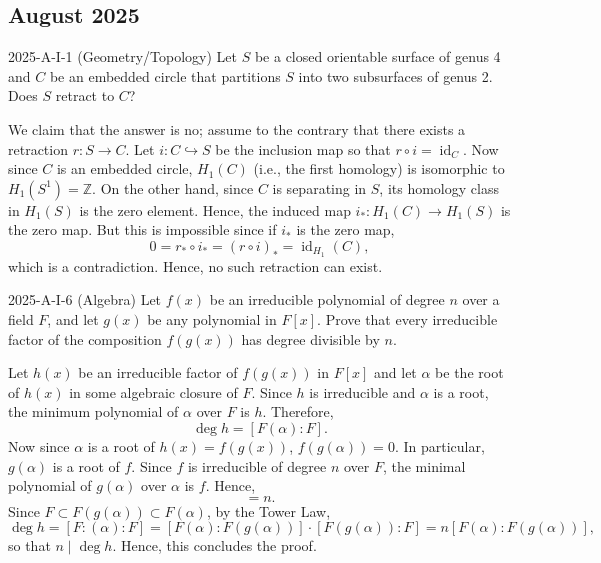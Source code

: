 \documentclass{article}
\begin{document}
\subsection{August 2025}
\begin{prb}{2025-A-I-1 (Geometry/Topology)}
	Let $S$ be a closed orientable surface of genus 4 and $C$ be an embedded circle that partitions $S$ into two subsurfaces of genus 2. Does $S$ retract to $C$? 
\end{prb}
\begin{solutions}
	We claim that the answer is no; assume to the contrary that there exists a retraction $r: S \to C$. Let $i: C \hookrightarrow S$ be the inclusion map so that $r \circ i = \operatorname{id}_{C}$. Now since $C$ is an embedded circle, $H_{1}(C)$ (i.e., the first homology) is isomorphic to $H_{1}(S^{1}) = \mathbb{Z}$. On the other hand, since $C$ is separating in $S$, its homology class in $H_{1}(S)$ is the zero element. Hence, the induced map $i_{\ast}: H_{1}(C) \to H_{1}(S)$ is the zero map. But this is impossible since if $i_{\ast}$ is the zero map,
	\begin{equation}
		0 = r_{\ast} \circ i_{\ast} = (r \circ i)_{\ast} = \operatorname{id}_{H_{1}}(C),
	\end{equation}
	which is a contradiction. Hence, no such retraction can exist. 
\end{solutions}
\begin{prb}{2025-A-I-6 (Algebra)}
	Let $f(x)$ be an irreducible polynomial of degree $n$ over a field $F$, and let $g(x)$ be any polynomial in $F[x]$. Prove that every irreducible factor of the composition $f(g(x))$ has degree divisible by $n$. 
\end{prb}
\begin{solutions}
	Let $h(x)$ be an irreducible factor of $f(g(x))$ in $F[x]$ and let $\alpha$ be the root of $h(x)$ in some algebraic closure of $F$. Since $h$ is irreducible and $\alpha$ is a root, the minimum polynomial of $\alpha$ over $F$ is $h$. Therefore, 
	\begin{equation}
		\deg{h} = [F(\alpha): F]. 
	\end{equation}
	Now since $\alpha$ is a root of $h(x)= f(g(x))$, $f(g(\alpha)) = 0$. In particular, $g(\alpha)$ is a root of $f$. Since $f$ is irreducible of degree $n$ over $F$, the minimal polynomial of $g(\alpha)$ over $\alpha$ is $f$. Hence, 
	\begin{equation}
		[F(g(\alpha)):F] = n. 
	\end{equation}
	Since $F \subset F(g(\alpha)) \subset F(\alpha)$, by the Tower Law, 
	\begin{equation}
		\deg{h} = [F:(\alpha):F] = [F(\alpha):F(g(\alpha))] \cdot [F(g(\alpha)): F] = n[F(\alpha):F(g(\alpha))],
	\end{equation}
	so that $n \mid \deg{h}$. Hence, this concludes the proof. 
\end{solutions}
\end{document}
